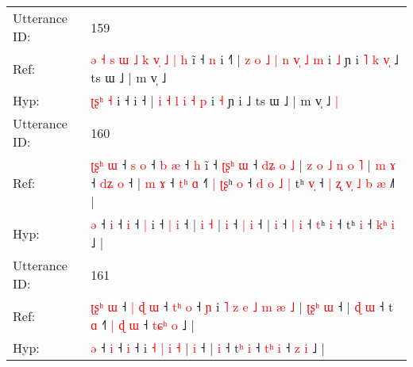 \documentclass[10pt]{article}
\DeclareRobustCommand{\hl}[1]{{\textcolor{red}{#1}}}
\begin{document}
\begin{longtable}{ll}
 \\
\midrule
Utterance ID: & 159 \\
Ref: & \hl{ə}\hl{ }\hl{˧}\hl{ }\hl{s}\hl{ }\hl{ɯ}\hl{ }\hl{˩}\hl{ }\hl{k}\hl{ }\hl{v}\hl{̩}\hl{ }\hl{˩}\hl{ }\hl{|} \hl{h} i\hl{̃} ˧\hl{ }\hl{n} i ˧\hl{˥} |\hl{ }\hl{z}\hl{ }\hl{o} \hl{˩} \hl{|} \hl{n} \hl{v}\hl{̩} \hl{˩} \hl{m} i \hl{˩} ɲ i\hl{ }\hl{˥}\hl{ }\hl{k}\hl{ }\hl{v}\hl{̩} ˩ ts ɯ ˩ | m v̩ ˩\hl{}\hl{}
 \\
Hyp: & \hl{}\hl{}\hl{}\hl{}\hl{}\hl{}\hl{}\hl{}\hl{}\hl{}\hl{}\hl{}\hl{}\hl{}\hl{}\hl{ʈ}\hl{ʂ}\hl{ʰ} \hl{˧} i\hl{} ˧\hl{}\hl{} i ˧\hl{} |\hl{}\hl{}\hl{}\hl{} \hl{i} \hl{˧} \hl{l} \hl{}\hl{i} \hl{˧} \hl{p} i \hl{˧} ɲ i\hl{}\hl{}\hl{}\hl{}\hl{}\hl{}\hl{} ˩ ts ɯ ˩ | m v̩ ˩\hl{ }\hl{|}
 \\
\midrule
Utterance ID: & 160 \\
Ref: & \hl{ʈ}\hl{ʂ}\hl{ʰ}\hl{ }\hl{ɯ} ˧\hl{ }\hl{s} \hl{o} ˧\hl{ }\hl{b} \hl{æ} ˧ \hl{h} i\hl{̃} ˧ \hl{ʈ}\hl{ʂ}\hl{ʰ} \hl{ɯ} ˧\hl{ }\hl{d}\hl{ʑ}\hl{ }\hl{o}\hl{ }\hl{˩} |\hl{ }\hl{z}\hl{ }\hl{o}\hl{ }\hl{˩}\hl{ }\hl{n} \hl{o} \hl{˥} |\hl{ }\hl{m} \hl{ɤ} ˧ \hl{d}\hl{ʑ} \hl{o} ˧ |\hl{ }\hl{m} \hl{ɤ} ˧ \hl{t}\hl{ʰ} \hl{ɑ} ˧\hl{˥}\hl{ }\hl{|} \hl{ʈ}\hl{ʂ}ʰ \hl{o} ˧\hl{ }\hl{d}\hl{ }\hl{o}\hl{ }\hl{˩}\hl{ }\hl{|} tʰ \hl{v}\hl{̩} ˧\hl{ }\hl{|}\hl{ }\hl{ʐ}\hl{ }\hl{v}\hl{̩} \hl{˩}\hl{ }\hl{b} \hl{æ} ˩\hl{˥} |
 \\
Hyp: & \hl{}\hl{}\hl{}\hl{}\hl{ə} ˧\hl{}\hl{} \hl{i} ˧\hl{}\hl{} \hl{i} ˧ \hl{|} i\hl{} ˧ \hl{}\hl{}\hl{|} \hl{i} ˧\hl{}\hl{}\hl{}\hl{}\hl{}\hl{}\hl{} |\hl{}\hl{}\hl{}\hl{}\hl{}\hl{}\hl{}\hl{} \hl{i} \hl{˧} |\hl{}\hl{} \hl{i} ˧ \hl{}\hl{|} \hl{i} ˧ |\hl{}\hl{} \hl{i} ˧ \hl{}\hl{|} \hl{i} ˧\hl{}\hl{}\hl{} \hl{}\hl{t}ʰ \hl{i} ˧\hl{}\hl{}\hl{}\hl{}\hl{}\hl{}\hl{}\hl{} tʰ \hl{}\hl{i} ˧\hl{}\hl{}\hl{}\hl{}\hl{}\hl{}\hl{} \hl{}\hl{k}\hl{ʰ} \hl{i} ˩\hl{} |
 \\
\midrule
Utterance ID: & 161 \\
Ref: & \hl{ʈ}\hl{ʂ}\hl{ʰ}\hl{ }\hl{ɯ} ˧\hl{ }\hl{|}\hl{ }\hl{ɖ} \hl{ɯ} ˧\hl{ }\hl{t}\hl{ʰ} \hl{o} ˧\hl{ }\hl{ɲ} i\hl{ }\hl{˥}\hl{ }\hl{z}\hl{ }\hl{e} \hl{˩} \hl{m} \hl{æ} \hl{˩} |\hl{ }\hl{ʈ}\hl{ʂ}\hl{ʰ} \hl{ɯ} ˧ |\hl{ }\hl{ɖ} \hl{ɯ} ˧ t\hl{} \hl{ɑ} ˧\hl{˥} \hl{|}\hl{ }\hl{ɖ} \hl{ɯ} ˧ \hl{t}\hl{ɕ}\hl{ʰ} \hl{o} ˩ |
 \\
Hyp: & \hl{}\hl{}\hl{}\hl{}\hl{ə} ˧\hl{}\hl{}\hl{}\hl{} \hl{i} ˧\hl{}\hl{}\hl{} \hl{i} ˧\hl{}\hl{} i\hl{}\hl{}\hl{}\hl{}\hl{}\hl{} \hl{˧} \hl{|} \hl{i} \hl{˧} |\hl{}\hl{}\hl{}\hl{} \hl{i} ˧ |\hl{}\hl{} \hl{i} ˧ t\hl{ʰ} \hl{i} ˧\hl{} \hl{}\hl{t}\hl{ʰ} \hl{i} ˧ \hl{}\hl{}\hl{z} \hl{i} ˩ |

\end{longtable}
\end{document}
